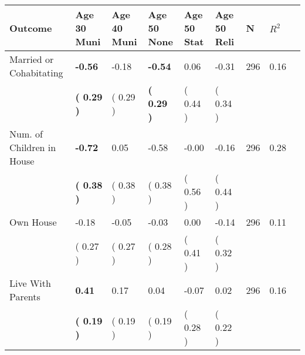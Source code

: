 \begin{tabular}{L{6.2cm} C{1.8cm} C{1.8cm} C{1.8cm} C{1.8cm} C{1.8cm} C{1.8cm} C{0.3cm} C{0.3cm}}
\toprule
 \textbf{Outcome} & \textbf{Age 30 Muni} & \textbf{Age 40 Muni} & \textbf{Age 50 None} & \textbf{Age 50 Stat} & \textbf{Age 50 Reli} & \textbf{N} & \textbf{$ R^2$} \\
\midrule
Married or Cohabitating & \textbf{    -0.56} &     -0.18 & \textbf{    -0.54} &      0.06 &     -0.31  & 296 &       0.16 \\ 
 & \textbf{(     0.29 )} & (     0.29 ) & \textbf{(     0.29 )} & (     0.44 ) & (     0.34 )  & \\
Num. of Children in House & \textbf{    -0.72} &      0.05 &     -0.58 &     -0.00 &     -0.16  & 296 &       0.28 \\ 
 & \textbf{(     0.38 )} & (     0.38 ) & (     0.38 ) & (     0.56 ) & (     0.44 )  & \\
Own House &     -0.18 &     -0.05 &     -0.03 &      0.00 &     -0.14  & 296 &       0.11 \\ 
 & (     0.27 ) & (     0.27 ) & (     0.28 ) & (     0.41 ) & (     0.32 )  & \\
Live With Parents & \textbf{     0.41} &      0.17 &      0.04 &     -0.07 &      0.02  & 296 &       0.16 \\ 
 & \textbf{(     0.19 )} & (     0.19 ) & (     0.19 ) & (     0.28 ) & (     0.22 )  & \\
\bottomrule
\end{tabular}
